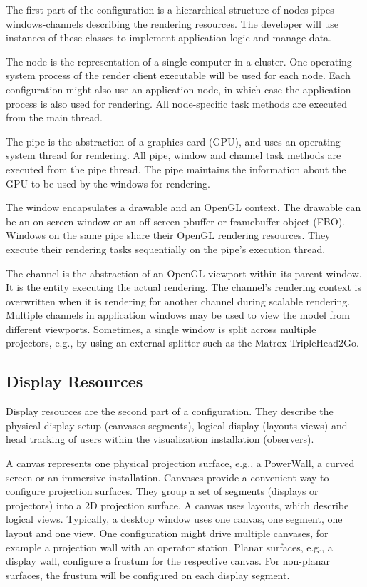 The first part of the configuration is a hierarchical structure of
nodes-pipes-win\-dows-channels describing the rendering resources. The developer
will use instances of these classes to implement application logic and manage
data.

The \textsf{node} is the representation of a single computer in a cluster. One operating
system process of the render client executable will be used for each node. Each
configuration might also use an application node, in which case the application
process is also used for rendering. All node-specific task methods are executed
from the main thread.

The \textsf{pipe} is the abstraction of a graphics card (GPU), and uses an
operating system thread for rendering. All pipe, window and channel task methods
are executed from the pipe thread. The pipe maintains the information about the
GPU to be used by the windows for rendering.

The \textsf{window} encapsulates a drawable and an OpenGL context. The drawable
can be an on-screen window or an off-screen pbuffer or framebuffer object (FBO).
Windows on the same pipe share their OpenGL rendering resources. They execute
their rendering tasks sequentially on the pipe's execution thread.

The \textsf{channel} is the abstraction of an OpenGL viewport within its parent
window. It is the entity executing the actual rendering. The channel's
rendering context is overwritten when it is rendering for another channel
during scalable rendering. Multiple channels in application windows may be used
to view the model from different viewports. Sometimes, a single window is split
across multiple projectors, e.g., by using an external splitter such as the
Matrox TripleHead2Go.


\subsection{Display Resources}

Display resources are the second part of a configuration. They describe the
physical display setup (canvases-segments), logical display (layouts-views) and
head tracking of users within the visualization installation (observers).

A \textsf{canvas} represents one physical projection surface, e.g., a
PowerWall, a curved screen or an immersive installation. Canvases provide a
convenient way to configure projection surfaces. They group a set of segments
(displays or projectors) into a 2D projection surface. A canvas uses layouts,
which describe logical views. Typically, a desktop window uses one canvas, one
segment, one layout and one view. One configuration might drive multiple
canvases, for example a projection wall with an operator station. Planar
surfaces, e.g., a display wall, configure a frustum for the respective canvas.
For non-planar surfaces, the frustum will be configured on each display
segment.

